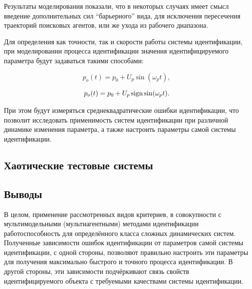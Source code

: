 \documentclass[a4paper,paratype,12pt,fouriernc]{cmonogra}
\begin{document}
Результаты моделирования показали, что в некоторых случаях
имеет смысл введение дополнительных сил ``барьерного'' вида,
для исключения пересечения траекторий поисковых агентов, или же ухода из рабочего диапазона.



Для определения как точности, так и скорости работы системы
идентификации, при моделировании процесса идентификации
значения идентифицируемого параметра будут задаваться такими способами:

\begin{equation}
  p_o(t) = p_0 +  U_{p} \sin( \omega_{p} t ),
  \label{atu:eq:p_sin}
\end{equation}

\begin{equation}
  p_o(t) = p_0 + U_{p} \operatorname*{sign} \sin( \omega_{p} t ).
  \label{atu:eq:p_sign}
\end{equation}

При этом будут измеряться среднеквадратические ошибки идентификации,
что позволит исследовать применимость систем идентификации
при различной динамике изменения параметра, а также
настроить параметры самой системы идентификации.


\subsection*{Хаотические тестовые системы }


% 












\subsection*{Выводы}

В целом, применение рассмотренных видов критериев, в совокупности
с мультимодельными (мультиагентными) методами идентификации
работоспособность для определённого класса сложных динамических систем.
Полученные зависимости ошибок идентификации от параметров
самой системы идентификации, с одной стороны, позволяют
правильно настроить эти параметры для получения максимально быстрого
и точного процесса идентификации. В другой стороны, эти зависимости
подчёркивают связь свойств идентифицируемого объекта с
требуемыми качествами системы идентификации.


\printbibliography
\label{e:atu}{~}

\FloatBarrier
\end{document}
